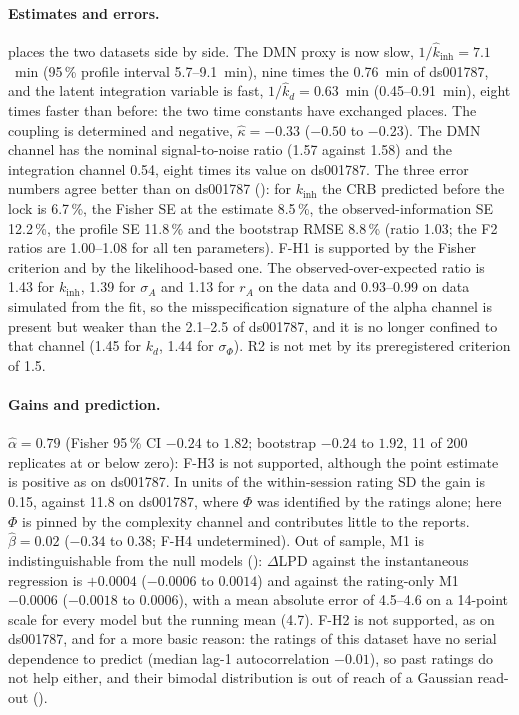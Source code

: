 \documentclass[12pt,a4paper]{article}
\theoremstyle{plain}
\theoremstyle{definition}
\theoremstyle{remark}
\newcommand{\kinh}{k_{\mathrm{inh}}}
\newcommand{\kd}{k_{d}}
\newcommand{\sA}{\sigma_{A}}
\newcommand{\sPhi}{\sigma_{\Phi}}
\newcommand{\rA}{r_{A}}
\begin{document}
\paragraph{Estimates and errors.}  places the two datasets side by side. The DMN proxy is now slow, $1/\hat k_{\mathrm{inh}}=7.1$~min (95\,\% profile interval 5.7--9.1~min), nine times the 0.76~min of ds001787, and the latent integration variable is fast, $1/\hat k_d=0.63$~min (0.45--0.91~min), eight times faster than before: the two time constants have exchanged places. The coupling is determined and negative, $\hat\kappa=-0.33$ ($-0.50$ to $-0.23$). The DMN channel has the nominal signal-to-noise ratio (1.57 against 1.58) and the integration channel 0.54, eight times its value on ds001787. The three error numbers agree better than on ds001787 (): for $\kinh$ the CRB predicted before the lock is 6.7\,\%, the Fisher SE at the estimate 8.5\,\%, the observed-information SE 12.2\,\%, the profile SE 11.8\,\% and the bootstrap RMSE 8.8\,\% (ratio 1.03; the F2 ratios are 1.00--1.08 for all ten parameters). F-H1 is supported by the Fisher criterion and by the likelihood-based one. The observed-over-expected ratio is 1.43 for $\kinh$, 1.39 for $\sA$ and 1.13 for $\rA$ on the data and 0.93--0.99 on data simulated from the fit, so the misspecification signature of the alpha channel is present but weaker than the 2.1--2.5 of ds001787, and it is no longer confined to that channel (1.45 for $\kd$, 1.44 for $\sPhi$). R2 is not met by its preregistered criterion of 1.5.

\paragraph{Gains and prediction.} $\hat\alpha=0.79$ (Fisher 95\,\% CI $-0.24$ to $1.82$; bootstrap $-0.24$ to $1.92$, 11 of 200 replicates at or below zero): F-H3 is not supported, although the point estimate is positive as on ds001787. In units of the within-session rating SD the gain is 0.15, against 11.8 on ds001787, where $\Phi$ was identified by the ratings alone; here $\Phi$ is pinned by the complexity channel and contributes little to the reports. $\hat\beta=0.02$ ($-0.34$ to $0.38$; F-H4 undetermined). Out of sample, M1 is indistinguishable from the null models (): $\Delta$LPD against the instantaneous regression is $+0.0004$ ($-0.0006$ to $0.0014$) and against the rating-only M1 $-0.0006$ ($-0.0018$ to $0.0006$), with a mean absolute error of 4.5--4.6 on a 14-point scale for every model but the running mean (4.7). F-H2 is not supported, as on ds001787, and for a more basic reason: the ratings of this dataset have no serial dependence to predict (median lag-1 autocorrelation $-0.01$), so past ratings do not help either, and their bimodal distribution is out of reach of a Gaussian read-out ().
\end{document}

